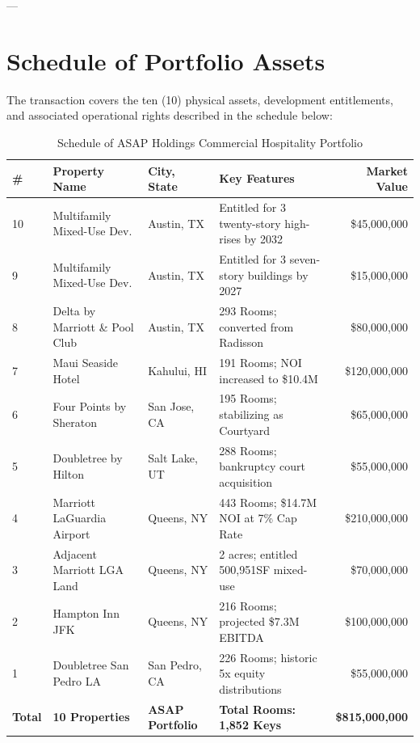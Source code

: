 \documentclass[11pt,a4paper]{article}
\begin{document}
---

\section{Schedule of Portfolio Assets}
The transaction covers the ten (10) physical assets, development entitlements, and associated operational rights described in the schedule below:
\par\vspace{10pt}

\begin{table}[h!]
\centering
\begin{tabularx}{\textwidth}{l l X l r}
\toprule
\textbf{\#} & \textbf{Property Name} & \textbf{City, State} & \textbf{Key Features} & \textbf{Market Value} \\
\midrule
10 & Multifamily Mixed-Use Dev. & Austin, TX & Entitled for 3 twenty-story high-rises by 2032 & \$45,000,000 \\
9 & Multifamily Mixed-Use Dev. & Austin, TX & Entitled for 3 seven-story buildings by 2027 & \$15,000,000 \\
8 & Delta by Marriott \& Pool Club & Austin, TX & 293 Rooms; converted from Radisson & \$80,000,000 \\
7 & Maui Seaside Hotel & Kahului, HI & 191 Rooms; NOI increased to \$10.4M & \$120,000,000 \\
6 & Four Points by Sheraton & San Jose, CA & 195 Rooms; stabilizing as Courtyard & \$65,000,000 \\
5 & Doubletree by Hilton & Salt Lake, UT & 288 Rooms; bankruptcy court acquisition & \$55,000,000 \\
4 & Marriott LaGuardia Airport & Queens, NY & 443 Rooms; \$14.7M NOI at 7\% Cap Rate & \$210,000,000 \\
3 & Adjacent Marriott LGA Land & Queens, NY & 2 acres; entitled 500,951SF mixed-use & \$70,000,000 \\
2 & Hampton Inn JFK & Queens, NY & 216 Rooms; projected \$7.3M EBITDA & \$100,000,000 \\
1 & Doubletree San Pedro LA & San Pedro, CA & 226 Rooms; historic 5x equity distributions & \$55,000,000 \\
\midrule
\textbf{Total} & \textbf{10 Properties} & \textbf{ASAP Portfolio} & \textbf{Total Rooms: 1,852 Keys} & \textbf{\$815,000,000} \\
\bottomrule
\end{tabularx}
\caption{Schedule of ASAP Holdings Commercial Hospitality Portfolio}
\end{table}
\end{document}
